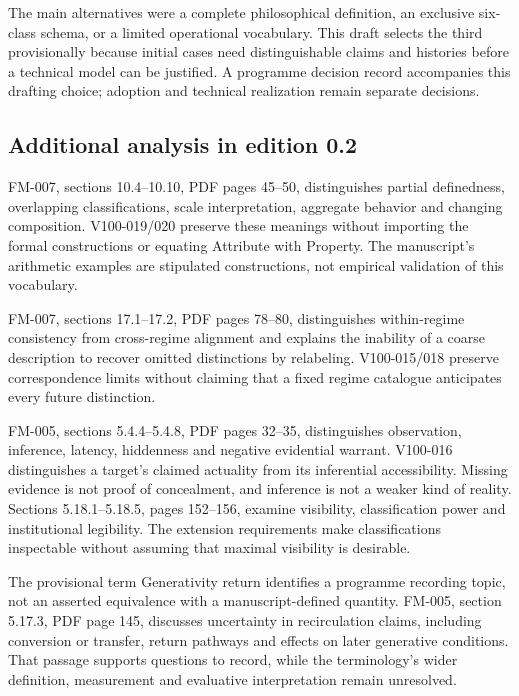 \documentclass[11pt,a4paper]{article}
\begin{document}
The main alternatives were a complete philosophical definition, an exclusive six-class schema, or a limited operational vocabulary. This draft selects the third provisionally because initial cases need distinguishable claims and histories before a technical model can be justified. A programme decision record accompanies this drafting choice; adoption and technical realization remain separate decisions.


\subsection{Additional analysis in edition 0.2}
FM-007, sections 10.4--10.10, PDF pages 45--50, distinguishes partial definedness, overlapping classifications, scale interpretation, aggregate behavior and changing composition. V100-019/020 preserve these meanings without importing the formal constructions or equating Attribute with Property. The manuscript's arithmetic examples are stipulated constructions, not empirical validation of this vocabulary.

FM-007, sections 17.1--17.2, PDF pages 78--80, distinguishes within-regime consistency from cross-regime alignment and explains the inability of a coarse description to recover omitted distinctions by relabeling. V100-015/018 preserve correspondence limits without claiming that a fixed regime catalogue anticipates every future distinction.

FM-005, sections 5.4.4--5.4.8, PDF pages 32--35, distinguishes observation, inference, latency, hiddenness and negative evidential warrant. V100-016 distinguishes a target's claimed actuality from its inferential accessibility. Missing evidence is not proof of concealment, and inference is not a weaker kind of reality. Sections 5.18.1--5.18.5, pages 152--156, examine visibility, classification power and institutional legibility. The extension requirements make classifications inspectable without assuming that maximal visibility is desirable.

The provisional term Generativity return identifies a programme recording topic, not an asserted equivalence with a manuscript-defined quantity. FM-005, section 5.17.3, PDF page 145, discusses uncertainty in recirculation claims, including conversion or transfer, return pathways and effects on later generative conditions. That passage supports questions to record, while the terminology's wider definition, measurement and evaluative interpretation remain unresolved.
\end{document}
